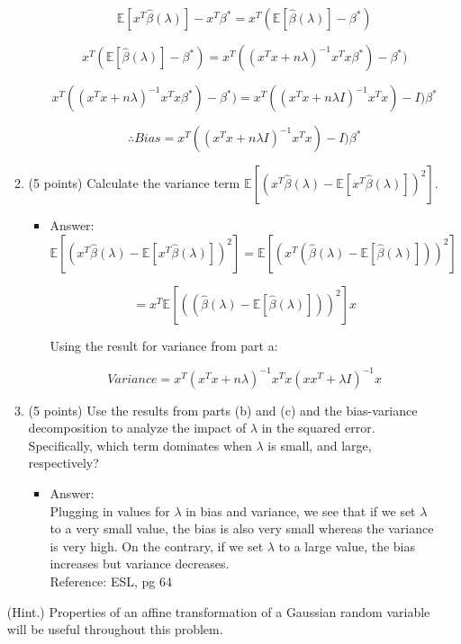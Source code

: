 \documentclass[twoside,12pt]{article}
\begin{document}
\begin{enumerate}
\begin{enumerate}
\begin{itemize}
$$ \mathbb E[x^T {\hat \beta}(\lambda)] - x^T {\beta^*}  = x^T(\mathbb E[ {\hat \beta}(\lambda)] - {\beta^*}) $$

$$x^T(\mathbb E[ {\hat \beta}(\lambda)] - {\beta^*})  = x^T((x^Tx + n\lambda)^{-1}x^Tx\beta^*) - {\beta^*})
$$

$$x^T((x^Tx + n\lambda)^{-1}x^Tx\beta^*) - {\beta^*}) = x^T((x^Tx + n\lambda I)^{-1}x^Tx) - I)\beta^*$$

$$\therefore Bias = x^T((x^Tx + n\lambda I)^{-1}x^Tx) - I)\beta^*$$

\end{itemize}
\item (5 points) Calculate the variance term $\mathbb E\left[\left(x^T {\hat \beta}(\lambda) - \mathbb E[x^T {\hat \beta}(\lambda)] \right)^2\right]$.
\begin{itemize}
\item Answer:\\

$$\mathbb E\left[\left(x^T {\hat \beta}(\lambda) - \mathbb E[x^T {\hat \beta}(\lambda)] \right)^2\right] = \mathbb E\left[\left(x^T ({\hat \beta}(\lambda) - \mathbb E[{\hat \beta}(\lambda)]) \right)^2\right]$$

$$ = x^T \mathbb E\left[\left(({\hat \beta}(\lambda) - \mathbb E[{\hat \beta}(\lambda)]) \right)^2\right]x$$

Using the result for variance from part a:

$$ Variance = x^T (x^Tx + n\lambda)^{-1} x^T x(xx^T + \lambda	I)^{-1}  x$$

\end{itemize}
\item (5 points) Use the results from parts (b) and (c) and the bias-variance decomposition to analyze the impact of $\lambda$ in the squared error. Specifically, which term dominates when $\lambda$ is small, and large, respectively?
\begin{itemize}
\item Answer:\\
Plugging in values for $\lambda$ in bias and variance, we see that if we set $\lambda$ to a very small value, the bias is also very small whereas the variance is very high. On the contrary, if we set $\lambda$ to a large value, the bias increases but variance decreases.\\
Reference: ESL, pg 64
\end{itemize}
\end{enumerate}


(Hint.) Properties of an affine transformation of a Gaussian random variable will be useful throughout this problem.

\end{enumerate}
\end{document}
